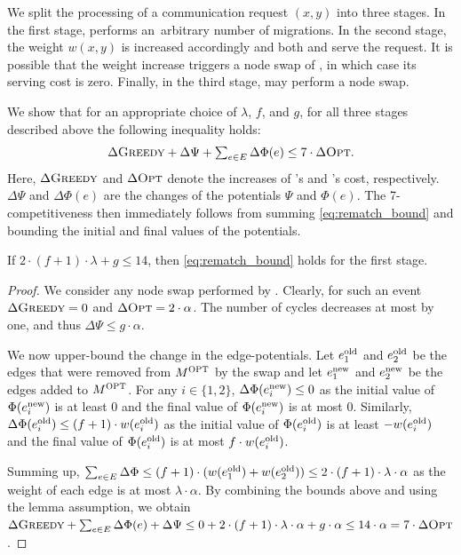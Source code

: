 We split the processing of a communication request $(x,y)$ into three stages. In
the first stage, \OPT performs an~arbitrary number of migrations. In the
second stage, the weight $w(x,y)$ is increased accordingly and both \OPT and
\GREEDY serve the request. It is possible that the weight increase triggers a
node swap of \GREEDY, in which case its serving cost is zero. Finally, in the
third stage, \GREEDY may perform a node swap.

We show that for an appropriate choice of $\lambda$, $f$, and $g$, for all
three stages described above the following inequality holds:
\begin{equation}
\label{eq:rematch_bound}
	\textstyle \Delta \textsc{Greedy} + \Delta \Psi + \sum_{e \in E} \Delta \Phi(e) \leq 7 \cdot \Delta \textsc{Opt}.
\end{equation}
Here, $\Delta \textsc{Greedy}$ and $\Delta \textsc{Opt}$ denote the increases of \GREEDY's and
\OPT's cost, respectively. $\Delta \Psi$ and $\Delta \Phi(e)$ are the changes
of the potentials $\Psi$ and $\Phi(e)$. The 7-competitiveness then immediately
follows from summing \eqref{eq:rematch_bound} and bounding the initial and
final values of the potentials. 

\begin{lemma}
\label{lem:opt_swap}
If $2 \cdot (f+1) \cdot \lambda + g \leq 14$, then \eqref{eq:rematch_bound}
holds for the first stage.
\end{lemma}

\begin{proof}
We consider any node swap performed by \OPT. Clearly, for such an event
$\Delta \textsc{Greedy} = 0$ and $\Delta \textsc{Opt} = 2 \cdot \alpha$. The number of cycles
decreases at most by one, and thus $\Delta \Psi \leq g \cdot \alpha$.

We now upper-bound the change in the edge-potentials. Let $e^\textrm{old}_1$ and
$e^\textrm{old}_2$ be the edges that were removed from $M^\textsc{OPT}$ by the swap and let
$e^\textrm{new}_1$ and $e^\textrm{new}_2$ be the edges added to $M^\textsc{OPT}$. For any $i \in
\{1,2\}$, $\Delta \Phi(e^\textrm{new}_i) \leq 0$ as the initial value of
$\Phi(e^\textrm{new}_i)$ is at least $0$ and the final value of $\Phi(e^\textrm{new}_i)$ is at
most $0$. Similarly, $\Delta \Phi(e^\textrm{old}_i) \leq (f+1) \cdot w(e^\textrm{old}_i)$ as the
initial value of $\Phi(e^\textrm{old}_i)$ is at least $-w(e^\textrm{old}_i)$ and the final value
of $\Phi(e^\textrm{old}_i)$ is at most $f \cdot w(e^\textrm{old}_i)$.

Summing up, $\sum_{e \in E} \Delta \Phi \leq (f+1) \cdot (w(e^\textrm{old}_1) +
w(e^\textrm{old}_2)) \leq 2 \cdot (f+1) \cdot \lambda \cdot \alpha$ as the weight of each edge
is at most $\lambda \cdot \alpha$. By combining the bounds above and using the
lemma assumption, we obtain $\Delta \textsc{Greedy} + \sum_{e \in E} \Delta \Phi(e) +
\Delta \Psi \leq 0 + 2 \cdot (f+1) \cdot \lambda \cdot \alpha + g \cdot \alpha 
\leq 14 \cdot \alpha = 7 \cdot \Delta \textsc{Opt}$.
\end{proof}


